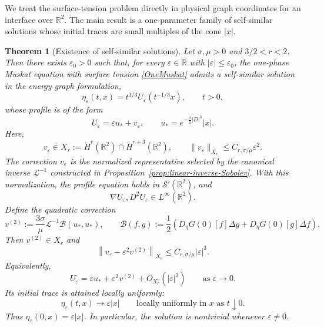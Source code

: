 \documentclass[12pt]{amsart}
\newtheorem{theorem}{Theorem}[section]
\theoremstyle{remark}
\theoremstyle{definition}
\numberwithin{equation}{section}
\newcommand{\R}{\mathbb{R}}
\begin{document}
We treat the surface-tension problem directly in physical graph
coordinates for an interface over \(\R^2\). The main result is a
one-parameter family of self-similar solutions whose initial traces are
small multiples of the cone \(|x|\).

\begin{theorem}[Existence of self-similar solutions]
\label{t:MainTheorem}
Let \(\sigma,\mu>0\) and \(3/2<r<2\).
Then there exists \(\varepsilon_0>0\) such that, for every \(\varepsilon\in\R\) with \(|\varepsilon|\leq\varepsilon_0\), the one-phase Muskat equation with surface tension \eqref{OneMuskat} admits a self-similar solution in the energy graph formulation,
\begin{equation*}
 \eta_\varepsilon(t,x)=t^{1/3}U_\varepsilon(t^{-1/3}x), \qquad t>0,
\end{equation*}
whose profile is of the form
\begin{equation*}
 U_\varepsilon=\varepsilon u_*+v_\varepsilon, \qquad u_*=e^{-\frac{\sigma}{\mu}|D|^3}|x|.
\end{equation*}
Here,
\begin{equation*}
  v_\varepsilon\in X_r:=\dot H^r(\R^2)\cap\dot H^{r+3}(\R^2), \qquad \|v_\varepsilon\|_{X_r}\leq C_{r,\sigma/\mu}\varepsilon^2.
\end{equation*}
The correction \(v_\varepsilon\) is the normalized representative selected by the canonical inverse \(\mathcal L^{-1}\) constructed in Proposition~\ref{prop:linear-inverse-Sobolev}.
With this normalization, the profile equation holds in \(\mathcal S'(\R^2)\), and
\begin{equation*}
 \nabla U_\varepsilon,D^2U_\varepsilon\in L^\infty(\R^2).
\end{equation*}
Define the quadratic correction 
\begin{equation*}
 v^{(2)}:=\frac{3\sigma}{\mu}\mathcal L^{-1}\mathcal B(u_*,u_*), \qquad  \mathcal B(f,g) := \frac12 \left( D_\eta G(0)[f]\Delta g + D_\eta G(0)[g]\Delta f \right).
\end{equation*}
Then \(v^{(2)}\in X_r\) and
\begin{equation*}
 \left\|v_\varepsilon-\varepsilon^2v^{(2)}\right\|_{X_r}\leq C_{r,\sigma/\mu}|\varepsilon|^3.
\end{equation*}
Equivalently,
\[
 U_\varepsilon=\varepsilon u_*+\varepsilon^2v^{(2)}+O_{X_r}(|\varepsilon|^3) \qquad\text{as }\varepsilon\to0.
\]
Its initial trace is attained locally uniformly:
\[
 \eta_\varepsilon(t,x)\longrightarrow\varepsilon|x|
 \qquad\text{locally uniformly in }x\text{ as }t\downarrow0.
\]
Thus \(\eta_\varepsilon(0,x)=\varepsilon|x|\).
In particular, the solution is nontrivial whenever \(\varepsilon\neq0\).
\end{theorem}
\end{document}
